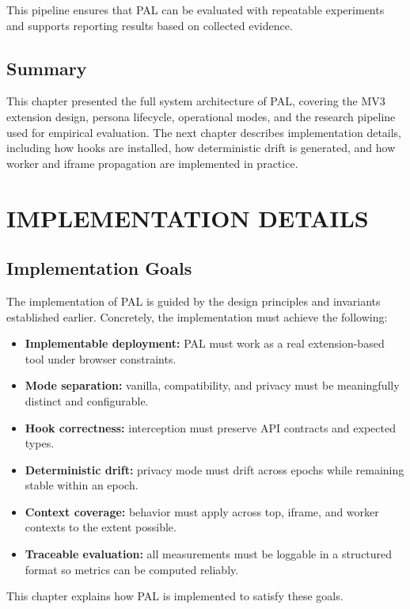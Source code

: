 \documentclass[11pt]{report}
\begin{document}
This pipeline ensures that PAL can be evaluated with repeatable experiments and supports reporting results based on collected evidence.

\section{Summary}

This chapter presented the full system architecture of PAL, covering the MV3 extension design, persona lifecycle, operational modes, and the research pipeline used for empirical evaluation. The next chapter describes implementation details, including how hooks are installed, how deterministic drift is generated, and how worker and iframe propagation are implemented in practice.

\chapter{IMPLEMENTATION DETAILS}

\section{Implementation Goals}

The implementation of PAL is guided by the design principles and invariants established earlier. Concretely, the implementation must achieve the following:

\begin{itemize}
    \item \textbf{Implementable deployment:} PAL must work as a real extension-based tool under browser constraints.
    \item \textbf{Mode separation:} vanilla, compatibility, and privacy must be meaningfully distinct and configurable.
    \item \textbf{Hook correctness:} interception must preserve API contracts and expected types.
    \item \textbf{Deterministic drift:} privacy mode must drift across epochs while remaining stable within an epoch.
    \item \textbf{Context coverage:} behavior must apply across top, iframe, and worker contexts to the extent possible.
    \item \textbf{Traceable evaluation:} all measurements must be loggable in a structured format so metrics can be computed reliably.
\end{itemize}

This chapter explains how PAL is implemented to satisfy these goals.
\end{document}
